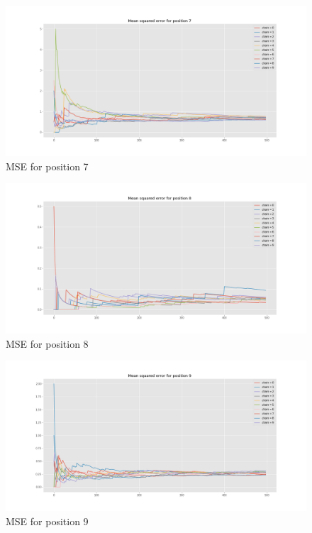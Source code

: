 \documentclass[]{article}
\begin{document}
	\begin{figure}[H]
		\begin{center}
			
			\includegraphics[width=1\textwidth]{task4/figures/T_2_4/Q2/mse_pos7.png}
			\caption*{MSE for position 7}
		\end{center}
	\end{figure}
	
	\begin{figure}[H]
		\begin{center}
			
			\includegraphics[width=1\textwidth]{task4/figures/T_2_4/Q2/mse_pos8.png}
			\caption*{MSE for position 8}
		\end{center}
	\end{figure}
	
	\begin{figure}[H]
		\begin{center}
			
			\includegraphics[width=1\textwidth]{task4/figures/T_2_4/Q2/mse_pos9.png}
			\caption*{MSE for position 9}
		\end{center}
	\end{figure}
	
\end{document}
